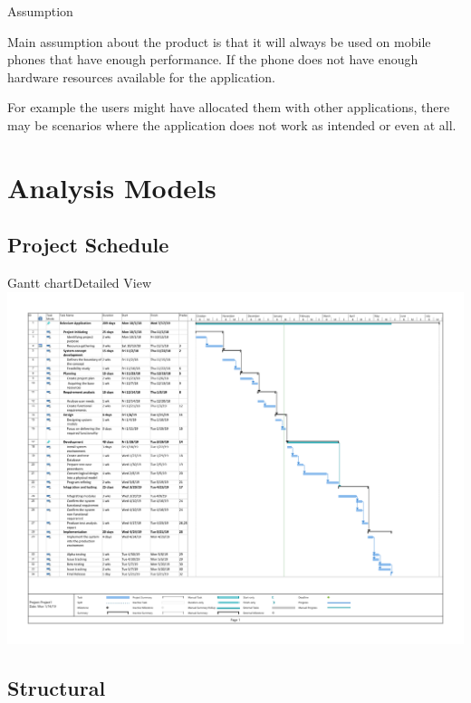 \documentclass{beamer}
\begin{document}
\begin{frame}{Assumption}

Main assumption about the product is that it will always be used on mobile phones that have enough performance. If the phone does not have enough hardware resources available for the application.

For example the users might have allocated them with other applications, there may be scenarios where the application does not work as intended or even at all.
    
\end{frame}



    


\section{Analysis Models}

\subsection{Project Schedule}

\begin{frame}{Gantt chart}{Detailed View}
    \includegraphics[width=\linewidth]{gantt/gantt_scale.pdf}
\end{frame}


\subsection{Structural}
\end{document}
